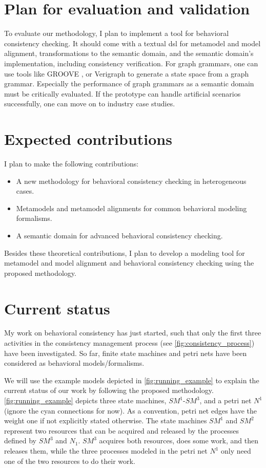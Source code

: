 \documentclass[conference]{IEEEtran}
\begin{document}
\section{Plan for evaluation and validation}
To evaluate our methodology, I plan to implement a tool for behavioral consistency checking.
It should come with a textual \gls{dsl} for metamodel and model alignment, transformations to the semantic domain, and the semantic domain's implementation, including consistency verification.
For graph grammars, one can use tools like GROOVE \cite{ghamarianModellingAnalysisUsing2012, rensinkGROOVESimulatorTool2004}, or Verigraph \cite{costaVerigraphSystemSpecification2016} to generate a state space from a graph grammar.
Especially the performance of graph grammars as a semantic domain must be critically evaluated.
If the prototype can handle artificial scenarios successfully, one can move on to industry case studies.

\section{Expected contributions}
I plan to make the following contributions:
\begin{itemize}
    \item A new methodology for behavioral consistency checking in heterogeneous cases.
    \item Metamodels and metamodel alignments for common behavioral modeling formalisms.
    \item A semantic domain for advanced behavioral consistency checking.
\end{itemize}
Besides these theoretical contributions, I plan to develop a modeling tool for metamodel and model alignment and behavioral consistency checking using the proposed methodology.
\section{Current status} \label{sec:currentStatus}
My work on behavioral consistency has just started, such that only the first three activities in the consistency management process (see \autoref{fig:consistency_process}) have been investigated.
So far, finite state machines and petri nets have been considered as behavioral models/formalisms.

We will use the example models depicted in \autoref{fig:running_example} to explain the current status of our work by following the proposed methodology.
\autoref{fig:running_example} depicts three state machines, $SM^1$-$SM^3$, and a petri net $N^1$ (ignore the cyan connections for now).
As a convention, petri net edges have the weight one if not explicitly stated otherwise.
The state machines $SM^1$ and $SM^2$ represent two resources that can be acquired and released by the processes defined by $SM^3$ and $N_1$.
$SM^3$ acquires both resources, does some work, and then releases them, while the three processes modeled in the petri net $N^1$ only need one of the two resources to do their work.
\end{document}
